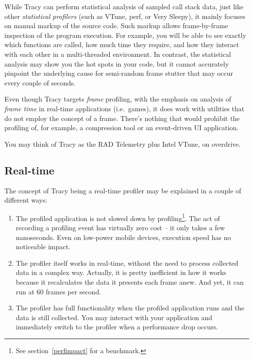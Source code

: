 \documentclass[hidelinks,titlepage,a4paper]{article}
\begin{document}
While Tracy can perform statistical analysis of sampled call stack data, just like other \emph{statistical profilers} (such as VTune, perf, or Very Sleepy), it mainly focuses on manual markup of the source code. Such markup allows frame-by-frame inspection of the program execution. For example, you will be able to see exactly which functions are called, how much time they require, and how they interact with each other in a multi-threaded environment. In contrast, the statistical analysis may show you the hot spots in your code, but it cannot accurately pinpoint the underlying cause for semi-random frame stutter that may occur every couple of seconds.

Even though Tracy targets \emph{frame} profiling, with the emphasis on analysis of \emph{frame time} in real-time applications (i.e.~games), it does work with utilities that do not employ the concept of a frame. There's nothing that would prohibit the profiling of, for example, a compression tool or an event-driven UI application.

You may think of Tracy as the RAD Telemetry plus Intel VTune, on overdrive.

\subsection{Real-time}

The concept of Tracy being a real-time profiler may be explained in a couple of different ways:

\begin{enumerate}
\item The profiled application is not slowed down by profiling\footnote{See section~\ref{perfimpact} for a benchmark.}. The act of recording a profiling event has virtually zero cost -- it only takes a few nanoseconds. Even on low-power mobile devices, execution speed has no noticeable impact.
\item The profiler itself works in real-time, without the need to process collected data in a complex way. Actually, it is pretty inefficient in how it works because it recalculates the data it presents each frame anew. And yet, it can run at 60 frames per second.
\item The profiler has full functionality when the profiled application runs and the data is still collected. You may interact with your application and immediately switch to the profiler when a performance drop occurs.
\end{enumerate}
\end{document}
